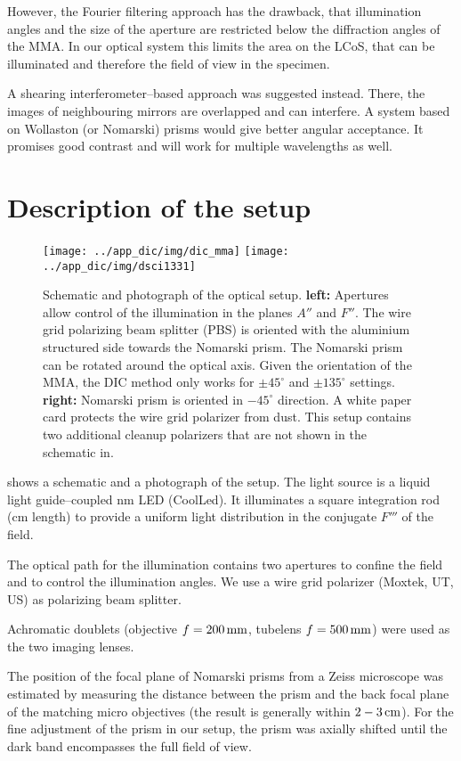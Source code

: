 However, the Fourier filtering approach has the drawback, that
illumination angles and the size of the aperture are restricted below
the diffraction angles of the MMA. In our optical system this limits
the area on the LCoS, that can be illuminated and therefore the field
of view in the specimen.

A shearing interferometer--based approach was suggested instead. There,
the images of neighbouring mirrors are overlapped and can interfere. A
system based on Wollaston (or Nomarski) prisms would give better
angular acceptance. It promises good contrast and will work for
multiple wavelengths as well.
\section{Description of the setup}
\begin{figure}[ht]
  \centering
  \texttt{[image: ../app\_dic/img/dic\_mma]}
  \texttt{[image: ../app\_dic/img/dsci1331]}
  \caption{ Schematic and photograph of the optical setup.  {\bf
      left:} Apertures allow control of the illumination in the planes
    $A''$ and $F''$. The wire grid polarizing beam splitter (PBS) is
    oriented with the aluminium structured side towards the Nomarski
    prism. The Nomarski prism can be rotated around the optical
    axis. Given the orientation of the MMA, the DIC method only works
    for $\pm 45^\circ$ and $\pm 135^\circ$ settings.  {\bf right:}
    Nomarski prism is oriented in $-45^\circ$ direction.  A white
    paper card protects the wire grid polarizer from dust.  This setup
    contains two additional cleanup polarizers that are not shown in
    the schematic in.}
  \label{fig:dic_mma}
\end{figure}
 shows a schematic and a photograph of the setup.
The light source is a liquid light guide--coupled \unit[480]{nm} LED
(CoolLed). It illuminates a square integration rod (\unit[10]{cm}
length) to provide a uniform light distribution in the conjugate
$F'''$ of the field. 

The optical path for the illumination contains two apertures to
confine the field and to control the illumination angles. We use a
wire grid polarizer (Moxtek, UT, US) as polarizing beam splitter.

Achromatic doublets (objective $f=\unit[200]{mm}$, tubelens
$f=\unit[500]{mm}$) were used as the two imaging lenses.

The position of the focal plane of Nomarski prisms from a Zeiss
microscope was estimated by measuring the distance between the prism
and the back focal plane of the matching micro objectives (the result
is generally within $\unit[2-3]{cm}$). For the fine adjustment of the
prism in our setup, the prism was axially shifted until the dark band
encompasses the full field of view.

